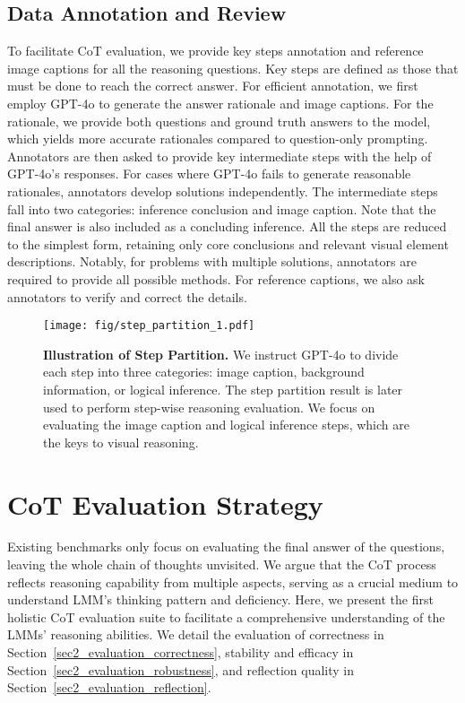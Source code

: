 \subsection{Data Annotation and Review}
To facilitate CoT evaluation, we provide key steps annotation and reference image captions for all the reasoning questions. Key steps are defined as those that must be done to reach the correct answer. For efficient annotation, we first employ GPT-4o to generate the answer rationale and image captions. For the rationale, we provide both questions and ground truth answers to the model, which yields more accurate rationales compared to question-only prompting. Annotators are then asked to provide key intermediate steps with the help of GPT-4o's responses. For cases where GPT-4o fails to generate reasonable rationales, annotators develop solutions independently. The intermediate steps fall into two categories: inference conclusion and image caption. Note that the final answer is also included as a concluding inference. All the steps are reduced to the simplest form, retaining only core conclusions and relevant visual element descriptions. Notably, for problems with multiple solutions, annotators are required to provide all possible methods. For reference captions, we also ask annotators to verify and correct the details.

\begin{figure*}[!t]
\centering
\texttt{[image: fig/step\_partition\_1.pdf]} 
\caption{\textbf{Illustration of Step Partition.} We instruct GPT-4o to divide each step into three categories: image caption, background information, or logical inference. The step partition result is later used to perform step-wise reasoning evaluation. We focus on evaluating the image caption and logical inference steps, which are the keys to visual reasoning.}
\label{fig-step-partition}
\end{figure*}

% 

\section{CoT Evaluation Strategy}
\label{sec2_evaluation}
Existing benchmarks only focus on evaluating the final answer of the questions, leaving the whole chain of thoughts unvisited. We argue that the CoT process reflects reasoning capability from multiple aspects, serving as a crucial medium to understand LMM's thinking pattern and deficiency. Here, we present the first holistic CoT evaluation suite to facilitate a comprehensive understanding of the LMMs' reasoning abilities. We detail the evaluation of correctness in Section~\ref{sec2_evaluation_correctness}, stability and efficacy in Section~\ref{sec2_evaluation_robustness}, and reflection quality in Section~\ref{sec2_evaluation_reflection}.

